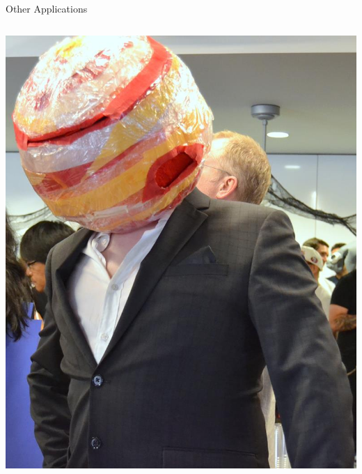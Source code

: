 \documentclass{beamer}
\begin{document}
\begin{frame}{Other Applications}
\begin{columns}
\begin{column}{0.48\textwidth}
{        \includegraphics{mr_jupiter.jpg}
}
    \end{column}
\end{columns}
\end{frame}
\end{document}
